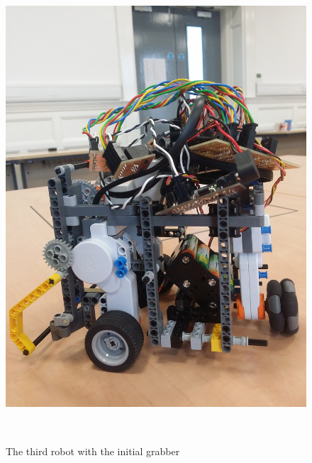 \documentclass[12pt]{article}
\begin{document}
\begin{figure}
	\centering
	\begin{minipage}[b]{.48\textwidth}
        \centering
		\includegraphics[scale=.065,angle=-90]{robot1.jpg}
		\caption{The third robot with the initial grabber}
		\label{fig:robot1}
	\end{minipage}
	~
	\begin{minipage}[b]{.48\textwidth}
        \centering

\end{minipage}
\end{figure}
\end{document}

